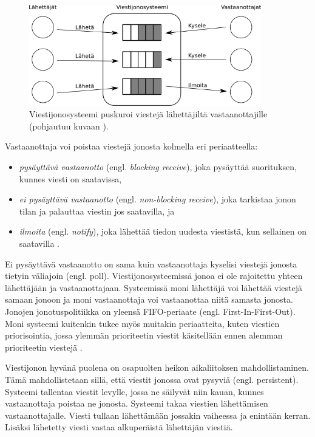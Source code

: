 \begin{figure}[ht!]
	\includegraphics[width=0.9\textwidth]{pictures/message-queue.png}
	\caption{Viestijonosysteemi puskuroi viestejä lähettäjiltä vastaanottajille (pohjautuu kuvaan \mbox{\cite[s.~255]{distributed-systems-concepts-and-design}}).}
	\label{fig:message-queue-communication}
\end{figure}

Vastaanottaja voi poistaa viestejä jonosta kolmella eri periaatteella:
\begin{itemize}
	\item \emph{pysäyttävä vastaanotto} (engl. \emph{blocking receive}), joka pysäyttää suorituksen, kunnes viesti on saatavissa,
	\item \emph{ei pysäyttävä vastaanotto} (engl. \emph{non-blocking receive}), joka tarkistaa jonon tilan ja palauttaa viestin jos saatavilla, ja
	\item \emph{ilmoita} (engl. \emph{notify}), joka lähettää tiedon uudesta viestistä, kun sellainen on saatavilla \cite[s.~254]{distributed-systems-concepts-and-design}.
\end{itemize}
Ei pysäyttävä vastaanotto on sama kuin vastaanottaja kyselisi viestejä jonosta tietyin väliajoin (engl. poll). Viestijonosysteemissä jonoa ei ole rajoitettu yhteen lähettäjään ja vastaanottajaan. Systeemissä moni lähettäjä voi lähettää viestejä samaan jonoon ja moni vastaanottaja voi vastaanottaa niitä samasta jonosta. Jonojen jonotuspolitiikka on yleensä FIFO-periaate (engl. First-In-First-Out). Moni systeemi kuitenkin tukee myös muitakin periaatteita, kuten viestien priorisointia, jossa ylemmän prioriteetin viestit käsitellään ennen alemman prioriteetin viestejä \cite[s.~120]{eugster2003many}.

Viestijonon hyvänä puolena on osapuolten heikon aikaliitoksen mahdollistaminen. Tämä mahdollistetaan sillä, että viestit jonossa ovat pysyviä (engl. persistent). Systeemi tallentaa viestit levylle, jossa ne säilyvät niin kauan, kunnes vastaanottaja poistaa ne jonosta. Systeemi takaa viestien lähettämisen vastaanottajalle. Viesti tullaan lähettämään jossakin vaiheessa ja enintään kerran. Lisäksi lähetetty viesti vastaa alkuperäistä lähettäjän viestiä. \mbox{\cite[s.~255]{distributed-systems-concepts-and-design}}

